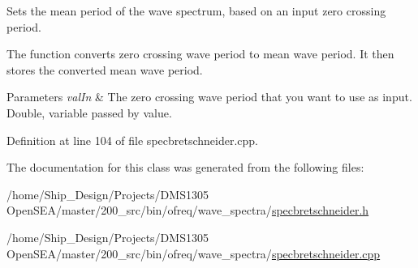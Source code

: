 Sets the mean period of the wave spectrum, based on an input zero crossing period. 

The function converts zero crossing wave period to mean wave period. It then stores the converted mean wave period. 
\begin{DoxyParams}{Parameters}
{\em val\-In} & The zero crossing wave period that you want to use as input. Double, variable passed by value. \\
\hline
\end{DoxyParams}


Definition at line 104 of file specbretschneider.\-cpp.



The documentation for this class was generated from the following files\-:\begin{DoxyCompactItemize}
\item 
/home/\-Ship\-\_\-\-Design/\-Projects/\-D\-M\-S1305 Open\-S\-E\-A/master/200\-\_\-src/bin/ofreq/wave\-\_\-spectra/\hyperlink{specbretschneider_8h}{specbretschneider.\-h}\item 
/home/\-Ship\-\_\-\-Design/\-Projects/\-D\-M\-S1305 Open\-S\-E\-A/master/200\-\_\-src/bin/ofreq/wave\-\_\-spectra/\hyperlink{specbretschneider_8cpp}{specbretschneider.\-cpp}\end{DoxyCompactItemize}
